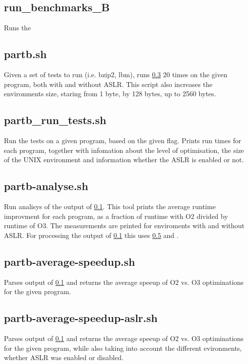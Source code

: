 \documentclass{article}
\begin{document}
\subsection{run_benchmarks_B} \label{tool:run_benchmark_B}
Runs the 

\subsection{partb.sh}
Given a set of tests to run (i.e. bzip2, lbm), runs \ref{tool:partb_run_tests.sh} 20 times on the given program, both with and without ASLR. This script also increases the environments size, staring from 1 byte, by 128 bytes, up to 2560 bytes.

\subsection{partb_run_tests.sh} \label{tool:partb_run_tests.sh}
Run the tests on a given program, based on the given flag. Prints run times for each program, together with infomation about the level of optimisation, the size of the UNIX environment and information whether the ASLR is enabled or not.

\subsection{partb-analyse.sh}
Run analisys of the output of \ref{tool:run_benchmark_B}. This tool prints the average runtime improvment for each program, as a fraction of runtime with O2 divided by runtime of O3. The measurements are printed for enviroments with and without ASLR. For processing the output of \ref{tool:run_benchmark_B} this uses \ref{tool:partb-average-speedup.sh} and \label{tool:partb-average-speedup-aslr.sh}.

\subsection{partb-average-speedup.sh} \label{tool:partb-average-speedup.sh}
Parses output of \ref{tool:run_benchmark_B} and returns the average speeup of O2 vs. O3 optiminations for the given program.

\subsection{partb-average-speedup-aslr.sh} \label{tool:partb-average-speedup-aslr.sh}
Parses output of \ref{tool:run_benchmark_B} and returns the average speeup of O2 vs. O3 optiminations for the given program, while also taking into account the different evironments, whether ASLR was enabled or disabled.
\end{document}
